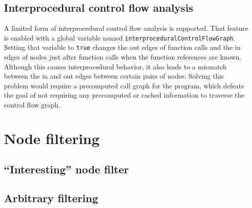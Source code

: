 \subsection{Interprocedural control flow analysis}

A limited form of interprocedural control flow analysis is supported.  That
feature is enabled with a global variable named
\lstinline{interproceduralControlFlowGraph}.  Setting that variable to
\lstinline{true} changes the out edges of function calls and the in edges
of nodes just after function calls when the function references are known.
Although this causes interprocedural behavior, it also leads to a mismatch
between the in and out edges between certain pairs of nodes.  Solving this
problem would require a precomputed call graph for the program, which
defeats the goal of not requiring any precomputed or cached information to
traverse the control flow graph.

\section{Node filtering}

\subsection{``Interesting'' node filter}

\subsection{Arbitrary filtering}

